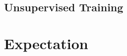 \documentclass[twoside,twocolumn]{article}
\begin{document}


\subsection{Unsupervised Training}



\section{Expectation}





\end{document}
